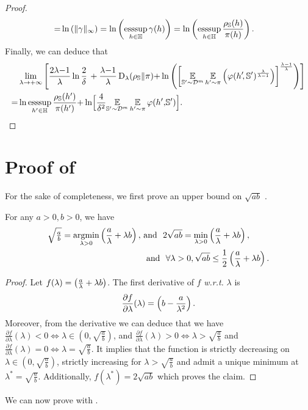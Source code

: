 \begin{noaddcontents}
\begin{proof}
\begin{align*}
    =& \ln\left( \|\gamma\|_{\infty}\right) = \ln\left(\operatorname*{\text{\rm esssup}}_{h\in\mathbb{H}}\gamma(h)\right) = \ln\left(\operatorname*{\text{\rm esssup}}_{h\in\mathbb{H}}\frac{\rho_{\mathbb{S}}(h)}{\pi(h)}\right).
\end{align*}
Finally, we can deduce that 
\begin{align*}
    &\lim_{\lambda\rightarrow +\infty}\left[{\frac{2\lambda{-}1}{\lambda}}\ln\frac{2}{\delta}\, +\frac{\lambda{-}1}{\lambda}\operatorname{D}_{\lambda}(\rho_{\mathbb{S}}\|\pi){+} \ln\left(\left[\operatorname*{\mathbb{E}}_{\mathbb{S}'{\sim}\mathcal{D}^{m}}\operatorname*{\mathbb{E}}_{h'{\sim}\pi}\left(\varphi(h'\!, \mathbb{S}')^{\frac{\lambda}{\lambda{-}1}}\right)\right]^{\frac{\lambda{-}1}{\lambda}}\right)\right]\\ 
    = &\ln{\displaystyle\operatorname*{\text{\rm esssup}}_{h'\in\ensuremath{\mathbb{H}}}}\,\frac{\rho_{\mathbb{S}}(h')}{\pi(h')}{+}\ln\!\Big[\frac{4}{\delta^2} {\displaystyle \operatorname*{\mathbb{E}}_{\mathbb{S}'{\sim}\mathcal{D}^{m}}\operatorname*{\mathbb{E}}_{h'{\sim}\pi}\varphi(h'{,}\mathbb{S}')}\Big].
\end{align*}
\end{proof}

\section{Proof of }
\label{chap:dis-pra:sec:proof-disintegrated-lambda}

For the sake of completeness, we first prove an upper bound on $\sqrt{ab}$ \citep[see, \eg,][]{ThiemannIgelWintenbergerSeldin2017}. 
\begin{lemma} For any $a>0, b>0$, we have
\begin{align*}
    \sqrt{\tfrac{a}{b}} = \argmin_{\lambda>0}\LP\frac{a}{\lambda}+\lambda b\RP,\ &\text{and}\ \ 2\sqrt{ab} = \min_{\lambda>0}\LP\frac{a}{\lambda}+\lambda b\RP,\\
    &\ \text{and}\ \ \forall\lambda>0, \sqrt{ab} \le \frac{1}{2}\LP\frac{a}{\lambda}+\lambda b\RP.
\end{align*}
\label{chap:dis-pra:lemma:sqrt}
\end{lemma}
\begin{proof}
Let $f(\lambda) = \left( \tfrac{a}{\lambda}+\lambda b \right)$. The first derivative of $f$ {\it w.r.t.} $\lambda$ is
\begin{align*}
    \frac{\partial f}{\partial\lambda}(\lambda) = \left( b-\frac{a}{\lambda^2}\right).
\end{align*}
Moreover, from the derivative we can deduce that  we have $\frac{\partial f}{\partial\lambda}(\lambda) < 0 \iff \lambda \in (0, \sqrt{\frac{a}{b}})$, and $\frac{\partial f}{\partial\lambda}(\lambda) > 0 \iff \lambda > \sqrt{\frac{a}{b}}$ and $\frac{\partial f}{\partial\lambda}(\lambda) = 0 \iff \lambda = \sqrt{\frac{a}{b}}$.
It implies that the function is strictly decreasing on $\lambda \in (0, \sqrt{\frac{a}{b}})$, strictly increasing for $\lambda > \sqrt{\frac{a}{b}}$ and admit a unique minimum at $\lambda^* = \sqrt{\frac{a}{b}}$.
Additionally, $f(\lambda^*)=2\sqrt{ab}$ which proves the claim.
\end{proof}
We can now prove  with .\\


\end{noaddcontents}
